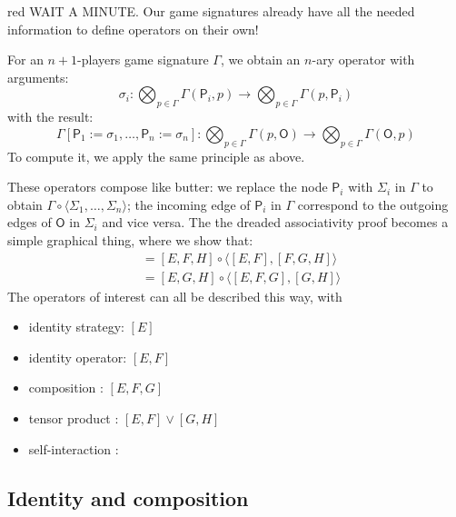 \documentclass[format=sigplan,authordraft]{acmart}
\newcommand{\kw}[1]{\ensuremath{ \mathsf{#1} }}
\begin{document}
\begin{color}{red}
WAIT A MINUTE.
Our game signatures already have all the needed information
to define operators on their own!

For an $n+1$-players game signature $\Gamma$,
we obtain an $n$-ary operator
with arguments:
\[
    \sigma_i : \bigotimes_{p \in \Gamma} \Gamma(\kw{P}_i, p) \rightarrow
               \bigotimes_{p \in \Gamma} \Gamma(p, \kw{P}_i)
\]
with the result:
\[
    \Gamma[\kw{P}_1 := \sigma_1, \ldots, \kw{P}_n := \sigma_n] :
    \bigotimes_{p \in \Gamma} \Gamma(p, \kw{O}) \rightarrow
    \bigotimes_{p \in \Gamma} \Gamma(\kw{O}, p)
\]
To compute it,
we apply the same principle as above.

These operators compose like butter:
we replace the node $\kw{P}_i$ with $\Sigma_i$ in $\Gamma$
to obtain $\Gamma \circ \langle \Sigma_1, \ldots , \Sigma_n \rangle$;
the incoming edge of $\kw{P}_i$ in $\Gamma$
correspond to the outgoing edges of $\kw{O}$ in $\Sigma_i$
and vice versa.
The the dreaded associativity proof becomes a simple
graphical thing, where we show that:
\begin{align*}
    [E,F,G,H] &= [E,F,H] \circ \langle [E,F], [F,G,H] \rangle \\
              &= [E,G,H] \circ \langle [E,F,G], [G,H] \rangle
\end{align*}
The operators of interest can all be described this way,
with
\begin{itemize}
\item identity strategy: $[E]$
\item identity operator: $[E,F]$
\item composition : $[E,F,G]$
\item tensor product : $[E,F] \vee [G,H]$
\item self-interaction :
\end{itemize}

\end{color}

\subsection{Identity and composition} %
\end{document}
